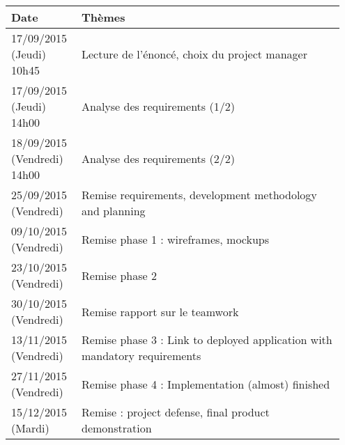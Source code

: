 \begin{tabular}{|p{0.2\linewidth}|p{0.75\linewidth}|}
    \hline
    Date & Thèmes \\
    \hline
    \hline
    17/09/2015 (Jeudi) 10h45 & Lecture de l'énoncé, choix du project
    manager \\
    \hline
    17/09/2015 (Jeudi) 14h00 & Analyse des requirements (1/2) \\
    \hline
    18/09/2015 (Vendredi) 14h00 & Analyse des requirements (2/2) \\
    \hline
    25/09/2015 (Vendredi) & Remise requirements, development methodology
    and planning \\
    \hline
    09/10/2015 (Vendredi) & Remise phase 1 : wireframes, mockups \\
    \hline
    23/10/2015 (Vendredi) & Remise phase 2 \\
    \hline
    30/10/2015 (Vendredi) & Remise rapport sur le teamwork \\
    \hline
    13/11/2015 (Vendredi) & Remise phase 3 : Link to deployed
    application with mandatory requirements \\
    \hline
    27/11/2015 (Vendredi) & Remise phase 4 : Implementation (almost)
    finished \\
    \hline
    15/12/2015 (Mardi) & Remise : project defense, final product
    demonstration \\
    \hline
\end{tabular}
